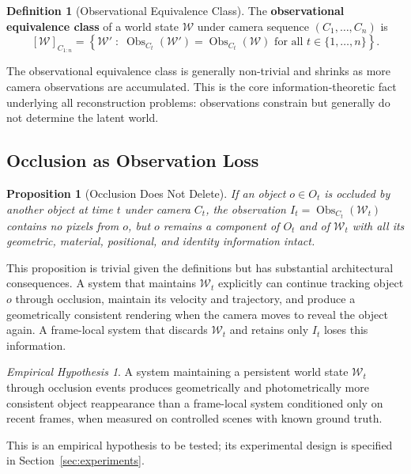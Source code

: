 \documentclass[11pt,a4paper]{article}
\theoremstyle{plain}
\newtheorem{proposition}[theorem]{Proposition}
\theoremstyle{definition}
\newtheorem{definition}[theorem]{Definition}
\theoremstyle{remark}
\newtheorem{hypothesis}[theorem]{Empirical Hypothesis}
\DeclareMathOperator{\Obs}{Obs}
\begin{document}
\begin{definition}[Observational Equivalence Class]
The \textbf{observational equivalence class} of a world state $\mathcal{W}$ under camera sequence $(C_1, \ldots, C_n)$ is
\[
[\mathcal{W}]_{C_{1:n}} = \left\{ \mathcal{W}' \;:\; \Obs_{C_t}(\mathcal{W}') = \Obs_{C_t}(\mathcal{W}) \text{ for all } t \in \{1, \ldots, n\} \right\}.
\]
\end{definition}

The observational equivalence class is generally non-trivial and shrinks as more camera observations are accumulated. This is the core information-theoretic fact underlying all reconstruction problems: observations constrain but generally do not determine the latent world.

\subsection{Occlusion as Observation Loss}

\begin{proposition}[Occlusion Does Not Delete]
If an object $o \in O_t$ is occluded by another object at time $t$ under camera $C_t$, the observation $I_t = \Obs_{C_t}(\mathcal{W}_t)$ contains no pixels from $o$, but $o$ remains a component of $O_t$ and of $\mathcal{W}_t$ with all its geometric, material, positional, and identity information intact.
\end{proposition}

This proposition is trivial given the definitions but has substantial architectural consequences. A system that maintains $\mathcal{W}_t$ explicitly can continue tracking object $o$ through occlusion, maintain its velocity and trajectory, and produce a geometrically consistent rendering when the camera moves to reveal the object again. A frame-local system that discards $\mathcal{W}_t$ and retains only $I_t$ loses this information.

\begin{hypothesis}
\label{hyp:occlusion}
A system maintaining a persistent world state $\mathcal{W}_t$ through occlusion events produces geometrically and photometrically more consistent object reappearance than a frame-local system conditioned only on recent frames, when measured on controlled scenes with known ground truth.
\end{hypothesis}

This is an empirical hypothesis to be tested; its experimental design is specified in Section~\ref{sec:experiments}.
\end{document}
